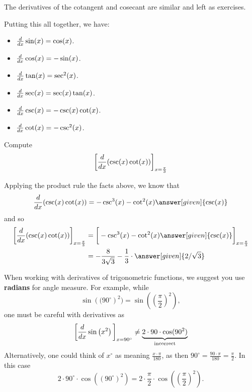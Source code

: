 \documentclass{ximera}
\begin{document}
The derivatives of the cotangent and cosecant are similar and left as
exercises. 

Putting this all together, we have:

\begin{theorem} \hfil
\begin{itemize}
\item $\frac{d}{dx} \sin(x) = \cos(x)$.
\item $\frac{d}{dx} \cos(x) = -\sin(x)$.
\item $\frac{d}{dx} \tan(x) = \sec^2(x)$.
\item $\frac{d}{dx} \sec(x) = \sec(x)\tan(x)$.
\item $\frac{d}{dx} \csc(x) = -\csc(x)\cot(x)$.
\item $\frac{d}{dx} \cot(x) = -\csc^2(x)$.
\end{itemize}
\end{theorem}

\begin{example}
Compute
\[
\bigg[ \frac{d}{dx} ( \csc(x) \cot(x) ) \bigg]_{x=\frac{\pi}{3}}
\]
\begin{explanation}
Applying the product rule the facts above, we know that
\[
\ddx ( \csc(x) \cot(x) ) = - \csc^3(x) - \cot^2(x)\answer[given]{\csc(x)}
\]
and so
\begin{align*}
\eval{\ddx ( \csc(x) \cot(x) )}_{x=\frac{\pi}{3}} &= \eval{  - \csc^3(x) - \cot^2(x) \answer[given]{\csc(x)}}_{x=\frac{\pi}{3}}  \\
&= - \frac{8}{3 \sqrt{3}} - \frac{1}{3}\cdot \answer[given]{2/\sqrt{3}}
\end{align*}
\end{explanation}
\end{example}


\begin{warning}
When working with derivatives of trigonometric functions, we suggest
you use \textbf{radians} for angle measure. For example, while
\[
\sin\left((90^\circ\right)^2) = \sin\left(\left(\frac{\pi}{2}\right)^2\right),
\]
one must be careful with derivatives as
\[
\bigg[ \frac{d}{dx} \sin\left(x^2\right) \bigg]_{x=90^\circ} \ne \underbrace{2\cdot 90\cdot \cos(90^2)}_{\text{incorrect}}
\]
Alternatively, one could think of $x^\circ$ as meaning
$\frac{x\cdot\pi}{180}$, as then $90^\circ = \frac{90\cdot\pi}{180} =
\frac{\pi}{2}$. In this case
\[
2\cdot 90^\circ\cdot \cos((90^\circ)^2) = 2\cdot \frac{\pi}{2}\cdot\cos\left(\left(\frac{\pi}{2}\right)^2\right).
\]
\end{warning}
\end{document}
